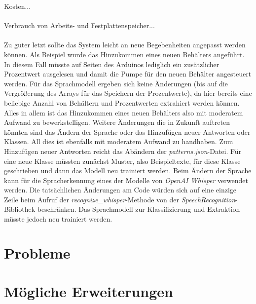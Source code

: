 Kosten...\\\\
Verbrauch von Arbeits- und Festplattenspeicher...\\\\
Zu guter letzt sollte das System leicht an neue Begebenheiten angepasst werden können. Als Beispiel wurde das Hinzukommen eines neuen Behälters angeführt. In diesem Fall müsste auf Seiten des Arduinos lediglich ein zusätzlicher Prozentwert ausgelesen und damit die Pumpe für den neuen Behälter angesteuert werden. Für das Sprachmodell ergeben sich keine Änderungen (bis auf die Vergrößerung des Arrays für das Speichern der Prozentwerte), da hier bereits eine beliebige Anzahl von Behältern und Prozentwerten extrahiert werden können. Alles in allem ist das Hinzukommen eines neuen Behälters also mit moderatem Aufwand zu bewerkstelligen. Weitere Änderungen die in Zukunft auftreten könnten sind das Ändern der Sprache oder das Hinzufügen neuer Antworten oder Klassen. All dies ist ebenfalls mit moderatem Aufwand zu handhaben. Zum Hinzufügen neuer Antworten reicht das Abändern der \textit{patterns.json}-Datei. Für eine neue Klasse müssten zunächst Muster, also Beispieltexte, für diese Klasse geschrieben und dann das Modell neu trainiert werden. Beim Ändern der Sprache kann für die Spracherkennung eines der Modelle von \textit{OpenAI Whisper} verwendet werden. Die tatsächlichen Änderungen am Code würden sich auf eine einzige Zeile beim Aufruf der \textit{recognize\_whisper}-Methode von der \textit{SpeechRecognition}-Bibliothek beschränken. Das Sprachmodell zur Klassifizierung und Extraktion müsste jedoch neu trainiert werden.
\section{Probleme}
\section{Mögliche Erweiterungen}




